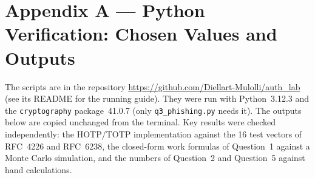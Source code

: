 \documentclass[11pt,a4paper]{article}
\begin{document}
\clearpage
\section*{Appendix A --- Python Verification: Chosen Values and Outputs}
The scripts are in the repository \url{https://github.com/Diellart-Mulolli/auth_lab} (see its README for the
running guide). They were run with Python~3.12.3 and the \texttt{cryptography} package~41.0.7 (only
\texttt{q3\_phishing.py} needs it). The outputs below are copied unchanged from the terminal. Key results were
checked independently: the HOTP/TOTP implementation against the 16 test vectors of RFC~4226 and RFC~6238, the
closed-form work formulas of Question~1 against a Monte Carlo simulation, and the numbers of Question~2 and
Question~5 against hand calculations.

\needspace{14.6cm}
\end{document}
